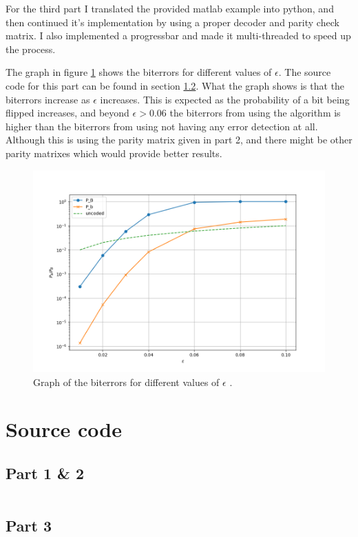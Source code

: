 \documentclass[a4paper]{article}
\begin{document}
For the third part I translated the provided matlab example into python, and then continued it's implementation by using a proper decoder and parity check matrix.
I also implemented a progressbar and made it multi-threaded to speed up the process.

The graph in figure \ref{fig:graph} shows the biterrors for different values of \(\epsilon\). The source code for this part can be found in section \ref{sec:source3}.
What the graph shows is that the biterrors increase as \(\epsilon\) increases. 
This is expected as the probability of a bit being flipped increases, and beyond \(\epsilon > 0.06\) the biterrors from using the algorithm is higher than the biterrors from using not having any error detection at all.
Although this is using the parity matrix given in part 2, and there might be other parity matrixes which would provide better results.

\begin{figure}[h]
    \includegraphics[width=\textwidth]{../Figure_1.png}
    \caption{Graph of the biterrors for different values of \(\epsilon\) .}
    \label{fig:graph}
\end{figure}

\newpage
\section{Source code}
\subsection{Part 1 \& 2}\label{sec:source12}
\inputminted[breaklines]{python}{../handin12.py}

\subsection{Part 3}\label{sec:source3}
\inputminted[breaklines]{python}{../handin3.py}
\end{document}
